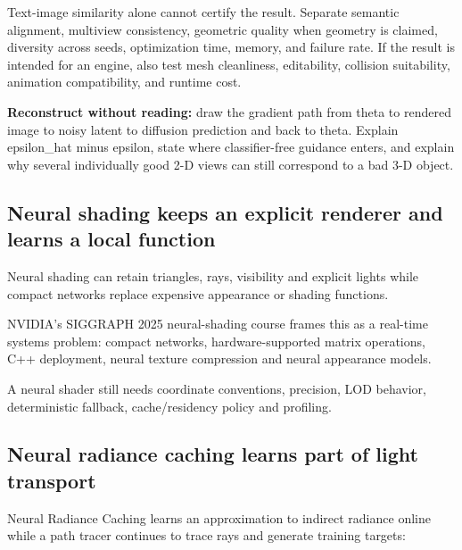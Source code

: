 Text-image similarity alone cannot certify the result. Separate semantic alignment, multiview consistency, geometric quality when geometry is claimed, diversity across seeds, optimization time, memory, and failure rate. If the result is intended for an engine, also test mesh cleanliness, editability, collision suitability, animation compatibility, and runtime cost.

\textbf{Reconstruct without reading:} draw the gradient path from theta to rendered image to noisy latent to diffusion prediction and back to theta. Explain epsilon\_hat minus epsilon, state where classifier-free guidance enters, and explain why several individually good 2-D views can still correspond to a bad 3-D object.

\subsection{Neural shading keeps an explicit renderer and learns a local function}\label{04-visual-computing-ii-ch035-neural-shading-keeps-an-explicit-renderer-and-learns-a-local-function}

\hypertarget{04-visual-computing-ii-ch035-neural-shading-keeps-an-explicit-renderer-and-learns-a-local-function}{}

Neural shading can retain triangles, rays, visibility and explicit lights while compact networks replace expensive appearance or shading functions.

NVIDIA's SIGGRAPH 2025 neural-shading course frames this as a real-time systems problem: compact networks, hardware-supported matrix operations, C++ deployment, neural texture compression and neural appearance models.

A neural shader still needs coordinate conventions, precision, LOD behavior, deterministic fallback, cache/residency policy and profiling.

\subsection{Neural radiance caching learns part of light transport}\label{04-visual-computing-ii-ch035-neural-radiance-caching-learns-part-of-light-transport}

\hypertarget{04-visual-computing-ii-ch035-neural-radiance-caching-learns-part-of-light-transport}{}

Neural Radiance Caching learns an approximation to indirect radiance online while a path tracer continues to trace rays and generate training targets:

